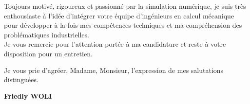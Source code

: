 \documentclass[11pt,a4paper]{article}
\begin{document}
	Toujours motivé, rigoureux et passionné par la simulation numérique, je suis très enthousiaste à l’idée d’intégrer votre équipe d’ingénieurs en calcul mécanique pour développer à la fois mes compétences techniques et ma compréhension des problématiques industrielles.\\
	
	Je vous remercie pour l’attention portée à ma candidature et reste à votre disposition pour un entretien.
	
	Je vous prie d’agréer, Madame, Monsieur, l’expression de mes salutations distinguées. \\ 
	
	\vspace{1cm}
	
	\begin{flushright}
		\textbf{Friedly WOLI}
	\end{flushright}
	
\end{document}
